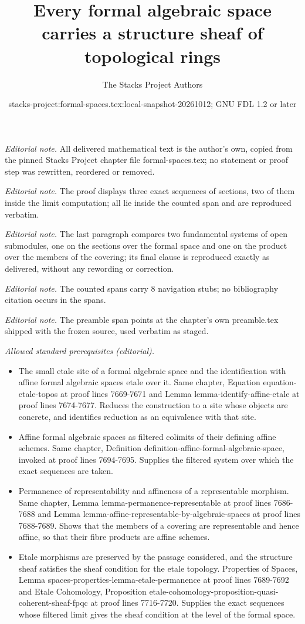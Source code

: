 \documentclass{stacks-project}
\title{Every formal algebraic space carries a structure sheaf of topological rings}
\author{The Stacks Project Authors}
\date{stacks-project:formal-spaces.tex:local-snapshot-20261012; GNU FDL 1.2 or later}
\theoremstyle{plain}
\theoremstyle{definition}
\theoremstyle{remark}
\numberwithin{equation}{subsection}
\begin{document}
\maketitle
\noindent\textit{Editorial note.} All delivered mathematical text is the author's own, copied from the pinned Stacks Project chapter file formal-spaces.tex; no statement or proof step was rewritten, reordered or removed.\par\medskip
\noindent\textit{Editorial note.} The proof displays three exact sequences of sections, two of them inside the limit computation; all lie inside the counted span and are reproduced verbatim.\par\medskip
\noindent\textit{Editorial note.} The last paragraph compares two fundamental systems of open submodules, one on the sections over the formal space and one on the product over the members of the covering; its final clause is reproduced exactly as delivered, without any rewording or correction.\par\medskip
\noindent\textit{Editorial note.} The counted spans carry 8 navigation stubs; no bibliography citation occurs in the spans.\par\medskip
\noindent\textit{Editorial note.} The preamble span points at the chapter's own preamble.tex shipped with the frozen source, used verbatim as staged.\par\medskip
\noindent\textit{Allowed standard prerequisites (editorial).}\begin{itemize}
\item The small etale site of a formal algebraic space and the identification with affine formal algebraic spaces etale over it. Same chapter, Equation equation-etale-topos at proof lines 7669-7671 and Lemma lemma-identify-affine-etale at proof lines 7674-7677. Reduces the construction to a site whose objects are concrete, and identifies reduction as an equivalence with that site.
\item Affine formal algebraic spaces as filtered colimits of their defining affine schemes. Same chapter, Definition definition-affine-formal-algebraic-space, invoked at proof lines 7694-7695. Supplies the filtered system over which the exact sequences are taken.
\item Permanence of representability and affineness of a representable morphism. Same chapter, Lemma lemma-permanence-representable at proof lines 7686-7688 and Lemma lemma-affine-representable-by-algebraic-spaces at proof lines 7688-7689. Shows that the members of a covering are representable and hence affine, so that their fibre products are affine schemes.
\item Etale morphisms are preserved by the passage considered, and the structure sheaf satisfies the sheaf condition for the etale topology. Properties of Spaces, Lemma spaces-properties-lemma-etale-permanence at proof lines 7689-7692 and Etale Cohomology, Proposition etale-cohomology-proposition-quasi-coherent-sheaf-fpqc at proof lines 7716-7720. Supplies the exact sequences whose filtered limit gives the sheaf condition at the level of the formal space.
\end{itemize}\medskip
\end{document}
